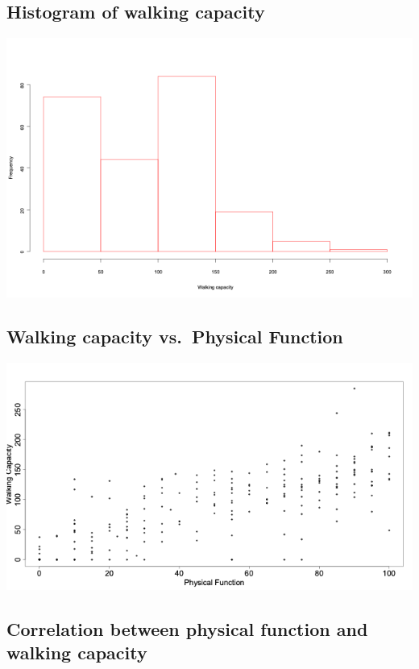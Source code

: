 \documentclass[
]{book}
\begin{document}
\hypertarget{histogram-of-walking-capacity}{%
\subsection{Histogram of walking capacity}\label{histogram-of-walking-capacity}}

\includegraphics[width=1\linewidth]{./12_13}

\hypertarget{walking-capacity-vs.-physical-function}{%
\subsection{Walking capacity vs.~Physical Function}\label{walking-capacity-vs.-physical-function}}

\includegraphics[width=1\linewidth]{./12_14}

\hypertarget{correlation-between-physical-function-and-walking-capacity}{%
\subsection{Correlation between physical function and walking capacity}\label{correlation-between-physical-function-and-walking-capacity}}
\end{document}
